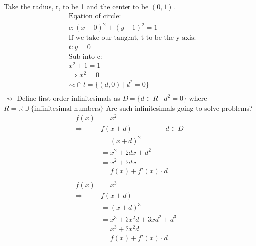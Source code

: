 \documentclass[a4paper,12pt]{article}
\begin{document}
Take the radius, r, to be 1 and the center to be $(0,1)$.
\begin{align*}
&\text{Eqation of circle:} \\
& c: (x-0)^2 + (y-1)^2 = 1 \\
&\text{If we take our tangent, t to be the y axis:} \\
& t: y = 0 \\
&\text{Sub into c:} \\
& x^2 +1 = 1 \\
& \Rightarrow x^2 = 0 \\
& \therefore c \cap t = \{(d,0)\;|\;d^2=0\} \\ 
\end{align*}
$\rightsquigarrow$ Define first order infinitesimals as $D = \{d \in R\;|\;d^2=0\}$ where $R = \mathbb{R} \cup \{\text{infinitesimal numbers}\}$
Are such infinitesimals going to solve problems?
\begin{align*}
f(x) & = x^2 \\
\Rightarrow & f(x + d) \hspace{2cm} d \in D \\
& = ( x + d )^2 \\
& = x^2 + 2dx + d^2 \\
& = x^2 + 2dx \\
& = f(x) + f'(x) \cdot d \\\\
f(x) & = x^3 \\
\Rightarrow & f(x + d) \\
& = (x + d)^3 \\
& = x^3 + 3x^2d + 3xd^2 + d^3 \\
& = x^3 + 3x^2d \\
& = f(x) + f'(x) \cdot d \\
\end{align*}
\end{document}

